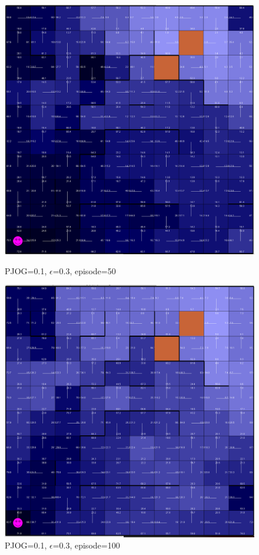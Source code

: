 \documentclass[11pt]{article}
\begin{document}
\begin{figure}[!htb]
   \begin{minipage}{0.4\textwidth}
     \centering
     \includegraphics[width=1.2\linewidth]{../figures/q2_3_50.png}
     \caption{PJOG=0.1, $\epsilon$=0.3, episode=50}\label{Fig:q2_3_50}
   \end{minipage}\hfill
   \begin{minipage}{0.4\textwidth}
     \centering
     \includegraphics[width=1.2\linewidth]{../figures/q2_3_100.png}
     \caption{PJOG=0.1, $\epsilon$=0.3, episode=100}\label{Fig:q2_3_100}
   \end{minipage}
\end{figure}
\end{document}
